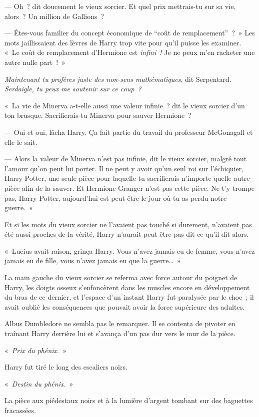 --- Oh~? dit doucement le vieux sorcier. Et quel prix mettrais-tu sur sa vie, alors~? Un million de Gallions~?

--- Êtes-vous familier du concept économique de “coût de remplacement”~?~» Les mots jaillissaient des lèvres de Harry trop vite pour qu'il puisse les examiner. «~Le coût de remplacement d'Hermione est \emph{infini~!} Je ne peux m'en racheter une autre nulle part~!~»

\emph{Maintenant tu profères juste des non-sens mathématiques}, dit Serpentard. \emph{Serdaigle, tu peux me soutenir sur ce coup~?}

«~La vie de Minerva a-t-elle aussi une valeur infinie~? dit le vieux sorcier d'un ton brusque. Sacrifierais-tu Minerva pour sauver Hermione~?

--- Oui et oui, lâcha Harry. Ça fait partie du travail du professeur McGonagall et elle le sait.

--- Alors la valeur de Minerva n'est pas infinie, dit le vieux sorcier, malgré tout l'amour qu'on peut lui porter. Il ne peut y avoir qu'un seul roi sur l'échiquier, Harry Potter, une seule pièce pour laquelle tu sacrifierais n'importe quelle autre pièce afin de la sauver. Et Hermione Granger n'est pas cette pièce. Ne t'y trompe pas, Harry Potter, aujourd'hui est peut-être le jour où tu as perdu notre guerre.~»

Et si les mots du vieux sorcier ne l'avaient pas touché si durement, n'avaient pas été aussi proches de la vérité, Harry n'aurait peut-être pas dit ce qu'il dit alors.

«~Lucius avait raison, grinça Harry. Vous n'avez jamais eu de femme, vous n'avez jamais eu de fille, vous n'avez jamais eu que la guerre…~»

La main gauche du vieux sorcier se referma avec force autour du poignet de Harry, les doigts osseux s'enfoncèrent dans les muscles encore en développement du bras de ce dernier, et l'espace d'un instant Harry fut paralysée par le choc~; il avait oublié les conséquences que pouvait avoir la force supérieure des adultes.

Albus Dumbledore ne sembla pas le remarquer. Il se contenta de pivoter en traînant Harry derrière lui et s'avança d'un pas dur vers le mur de la pièce.

«~\emph{Prix du phénix}.~»

Harry fut tiré le long des escaliers noirs.

«~\emph{Destin du phénix.}~»

La pièce aux piédestaux noirs et à la lumière d'argent tombant sur des baguettes fracassées.

